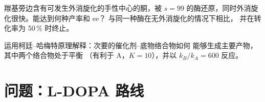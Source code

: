 \begin{exercise}[$\star\star\star$]\label{exo:b3:asymmetric-synthesis:11}
羰基旁边含有可发生外消旋化的手性中心的酮，被
$s = 99$ 的酶还原，同时外消旋化很快。能达到何种产率和 ee？
与同一种酶在无外消旋化的情况下相比，
并在转化率为 50\,\% 时终止。
\end{exercise}

\begin{exercise}[$\star\star\star$]\label{exo:b3:asymmetric-synthesis:12}
运用柯廷–哈梅特原理解释：次要的催化剂–底物络合物如何
能够生成主要产物，其中两个络合物处于平衡
（有利于 A，$K = 10$），并以 $k_B/k_A = 600$ 反应。
\end{exercise}

\section{问题：L-DOPA 路线}

